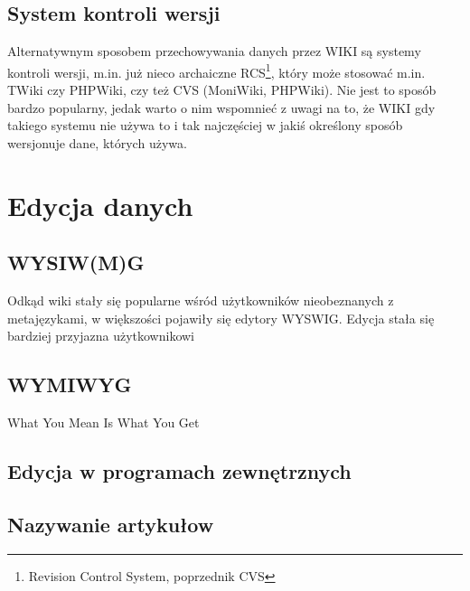 \documentclass{article}
\begin{document}
	\subsection{System kontroli wersji}
	Alternatywnym sposobem przechowywania danych przez WIKI są systemy kontroli wersji, m.in. już nieco archaiczne RCS\footnote{Revision Control System, poprzednik CVS}, który może stosować m.in. TWiki czy PHPWiki, czy też CVS (MoniWiki, PHPWiki). Nie jest to sposób bardzo popularny, jedak warto o nim wspomnieć z uwagi na to, że WIKI gdy takiego systemu nie używa to i tak najczęściej w jakiś określony sposób wersjonuje dane, których używa.
\newpage
\section{Edycja danych}
	\subsection{WYSIW(M)G}
	Odkąd wiki stały się popularne wśród użytkowników nieobeznanych z metajęzykami, 
w większości pojawiły się edytory WYSWIG. Edycja stała się bardziej przyjazna użytkownikowi

	\subsection{WYMIWYG}
What You Mean Is What You Get

	\subsection{Edycja w programach zewnętrznych}


	\subsection{Nazywanie artykułow}
\end{document}
